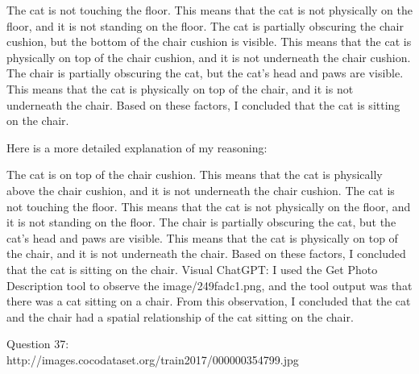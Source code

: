 \begin{enumerate}
        The cat is not touching the floor. This means that the cat is not physically on the floor, and it is not standing on the floor.
        The cat is partially obscuring the chair cushion, but the bottom of the chair cushion is visible. This means that the cat is physically on top of the chair cushion, and it is not underneath the chair cushion.
        The chair is partially obscuring the cat, but the cat's head and paws are visible. This means that the cat is physically on top of the chair, and it is not underneath the chair.
        Based on these factors, I concluded that the cat is sitting on the chair.

        Here is a more detailed explanation of my reasoning:

        The cat is on top of the chair cushion. This means that the cat is physically above the chair cushion, and it is not underneath the chair cushion.
        The cat is not touching the floor. This means that the cat is not physically on the floor, and it is not standing on the floor.
        The chair is partially obscuring the cat, but the cat's head and paws are visible. This means that the cat is physically on top of the chair, and it is not underneath the chair.
        Based on these factors, I concluded that the cat is sitting on the chair.
        \subitem Visual ChatGPT: I used the Get Photo Description tool to observe the image/249fadc1.png, and the tool output was that there was a cat sitting on a chair. From this observation, I concluded that the cat and the chair had a spatial relationship of the cat sitting on the chair.
    \end{enumerate}
    Question 37:\\http://images.cocodataset.org/train2017/000000354799.jpg
